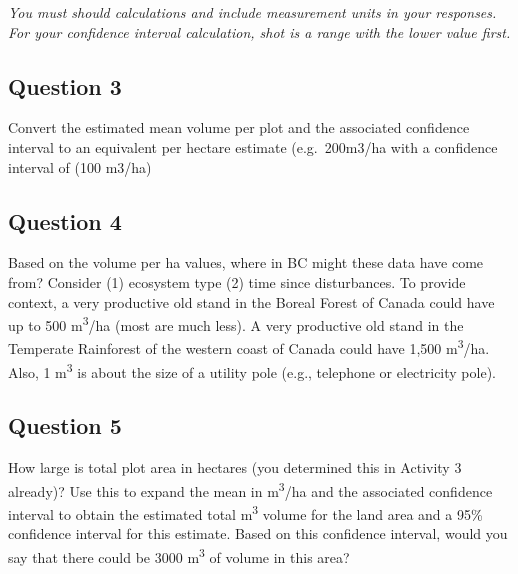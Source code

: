 \documentclass[
  letterpaper,
]{book}
\begin{document}
\begin{tcolorbox}[enhanced jigsaw, colbacktitle=quarto-callout-note-color!10!white, leftrule=.75mm, left=2mm, opacitybacktitle=0.6, breakable, colframe=quarto-callout-note-color-frame, arc=.35mm, bottomtitle=1mm, rightrule=.15mm, title=\textcolor{quarto-callout-note-color}{\faInfo}\hspace{0.5em}{Note}, toptitle=1mm, titlerule=0mm, opacityback=0, coltitle=black, colback=white, bottomrule=.15mm, toprule=.15mm]

\emph{You must should calculations and include measurement units in your
responses. For your confidence interval calculation, shot is a range
with the lower value first.}

\end{tcolorbox}

\hypertarget{question-3-2}{%
\subsection*{Question 3}\label{question-3-2}}

Convert the estimated mean volume per plot and the associated confidence
interval to an equivalent per hectare estimate (e.g.~200m3/ha with a
confidence interval of (100 m3/ha)

\hypertarget{question-4-2}{%
\subsection*{Question 4}\label{question-4-2}}

Based on the volume per ha values, where in BC might these data have
come from? Consider (1) ecosystem type (2) time since disturbances. To
provide context, a very productive old stand in the Boreal Forest of
Canada could have up to 500 m\textsuperscript{3}/ha (most are much
less). A very productive old stand in the Temperate Rainforest of the
western coast of Canada could have 1,500 m\textsuperscript{3}/ha. Also,
1 m\textsuperscript{3} is about the size of a utility pole (e.g.,
telephone or electricity pole).

\hypertarget{question-5-2}{%
\subsection*{Question 5}\label{question-5-2}}

How large is total plot area in hectares (you determined this in
Activity 3 already)? Use this to expand the mean in
m\textsuperscript{3}/ha and the associated confidence interval to obtain
the estimated total m\textsuperscript{3} volume for the land area and a
95\% confidence interval for this estimate. Based on this confidence
interval, would you say that there could be 3000 m\textsuperscript{3} of
volume in this area?
\end{document}
